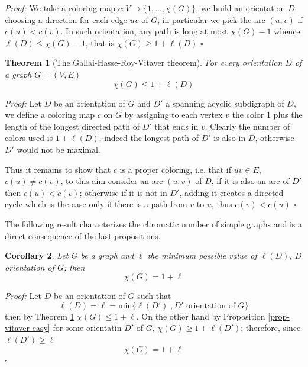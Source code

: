 \documentclass[a4paper,12pt,oneside]{book}
\newtheorem{theorem}{Theorem}[chapter]
\newtheorem{corollary}[theorem]{Corollary}
\newcommand*{\QED}{\hfill\ensuremath{\square}}
\begin{document}
\textit{Proof:}  We take a coloring map $c:V\rightarrow \{1,...,\chi (G)\}$, we build an orientation
 $D$ choosing a direction for each edge $uv$ of $G$, in particular we pick the arc 
 $(u,v)$ if $c(u)< c(v)$. In such orientation, any path is long at most $\chi 
 (G)-1$ whence $\ell(D)\leq \chi (G)-1  $, that is $ \chi (G) \geq 1+\ell(D) $ 
\QED

\begin{theorem}[The Gallai-Hasse-Roy-Vitaver theorem]\label{vitaver}
For every orientation $D$ of a graph $G=(V,E)$ $$\chi (G)\leq 1 + \ell(D)$$
\end{theorem}
\textit{Proof: }Let $D$ be an orientation of $G$ and $D'$ a spanning acyclic subdigraph of $D$, we define a coloring map $c$ on $G$ by assigning to each vertex $v$ the color 1 plus the length of the longest directed path of $D'$ that ends in $v$. Clearly the number of colors used is $1+\ell(D)$, indeed the longest path of $D'$ is also in $D$, otherwise $D'$ would not be maximal. 

Thus it remains to show that $c$ is a proper coloring, i.e. that if $uv\in E$, $c(u)\neq c(v) $, to this aim consider an arc $(u,v)$ of $D$, if it is also an arc of $D'$ then $c(u)<c(v)$; otherwise if it is not in $D'$, adding it creates a directed cycle which is the case only if there is a path from $v$ to $u$, thus $c(v)<c(u)$ \QED

\noindent The following result characterizes the chromatic number of simple graphs and is a direct consequence of the last propositions.
\begin{corollary}\label{cor-vitaver}
Let $G$ be a graph and $\ell$ the minimum possible value of $\ell(D)$, $D$ orientation of $G$; then   
$$\chi (G)=1+\ell$$
\end{corollary}

\textit{Proof:}
Let $D$ be an orientation of $G$ such that 
$$\ell(D)=\ell=\textrm{min}\{\ell(D') \; 	,D' \textrm{ orientation of } G\}$$ 
then by Theorem \ref{vitaver} $\chi(G) \leq 1+\ell$. On the other hand by Proposition \ref{prop-vitaver-easy} for some orientatin $D'$  of $G$, $\chi(G)\geq 1+\ell(D')$; therefore, since $\ell(D')\geq\ell$ 
$$\chi (G)=1+\ell$$\QED
\end{document}
